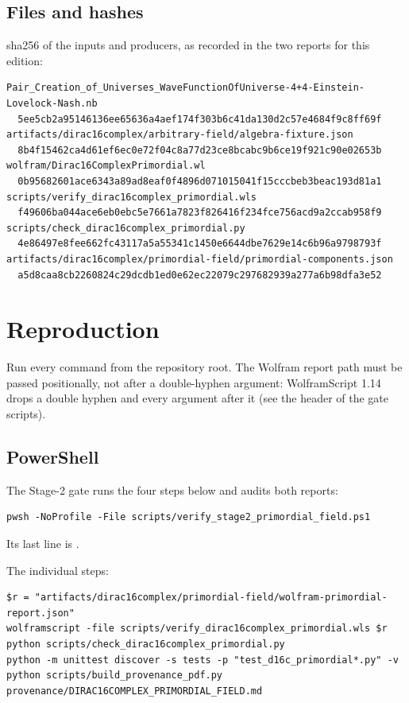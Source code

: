\documentclass[11pt]{article}
\begin{document}
\subsection{Files and hashes}

sha256 of the inputs and producers, as recorded in the two reports for this edition:

\begin{Verbatim}[fontsize=\small]
Pair_Creation_of_Universes_WaveFunctionOfUniverse-4+4-Einstein-Lovelock-Nash.nb
  5ee5cb2a95146136ee65636a4aef174f303b6c41da130d2c57e4684f9c8ff69f
artifacts/dirac16complex/arbitrary-field/algebra-fixture.json
  8b4f15462ca4d61ef6ec0e72f04c8a77d23ce8bcabc9b6ce19f921c90e02653b
wolfram/Dirac16ComplexPrimordial.wl
  0b95682601ace6343a89ad8eaf0f4896d071015041f15cccbeb3beac193d81a1
scripts/verify_dirac16complex_primordial.wls
  f49606ba044ace6eb0ebc5e7661a7823f826416f234fce756acd9a2ccab958f9
scripts/check_dirac16complex_primordial.py
  4e86497e8fee662fc43117a5a55341c1450e6644dbe7629e14c6b96a9798793f
artifacts/dirac16complex/primordial-field/primordial-components.json
  a5d8caa8cb2260824c29dcdb1ed0e62ec22079c297682939a277a6b98dfa3e52
\end{Verbatim}

\section{Reproduction}

Run every command from the repository root. The Wolfram report path must be passed positionally, not after a double-hyphen argument: WolframScript 1.14 drops a double hyphen and every argument after it (see the header of the gate scripts).

\subsection{PowerShell}

The Stage-2 gate runs the four steps below and audits both reports:

\begin{Verbatim}[fontsize=\small]
pwsh -NoProfile -File scripts/verify_stage2_primordial_field.ps1
\end{Verbatim}

Its last line is \texttt{}.

The individual steps:

\begin{Verbatim}[fontsize=\small]
$r = "artifacts/dirac16complex/primordial-field/wolfram-primordial-report.json"
wolframscript -file scripts/verify_dirac16complex_primordial.wls $r
python scripts/check_dirac16complex_primordial.py
python -m unittest discover -s tests -p "test_d16c_primordial*.py" -v
python scripts/build_provenance_pdf.py provenance/DIRAC16COMPLEX_PRIMORDIAL_FIELD.md
\end{Verbatim}
\end{document}
